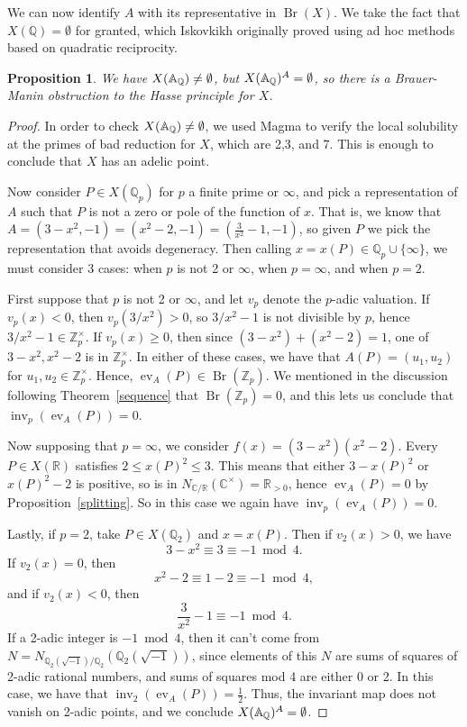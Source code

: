 \documentclass[12pt,twoside]{reedthesis}
\theoremstyle{plain}
\newtheorem{proposition}[theorem]{Proposition}
\theoremstyle{definition}
\theoremstyle{remark}
\newcommand{\ZZ}{\mathbb{Z}}
\newcommand{\Affine}{\mathbb{A}}
\newcommand{\QQ}{\mathbb{Q}}
\newcommand{\RR}{\mathbb{R}}
\newcommand{\CC}{\mathbb{C}}
\newcommand{\Br}{\operatorname{Br}}
\newcommand{\adele}{\reflectbox{$\Affine$}}
\newcommand{\ev}{\operatorname{ev}}
\newcommand{\inv}{\operatorname{inv}}
\begin{document}
\noindent We can now identify $A$ with its representative in $\Br(X)$. We take the fact that $X(\QQ)=\emptyset$ for granted, which Iskovkikh originally proved using ad hoc methods based on quadratic reciprocity.
\begin{proposition}
We have $X(\adele_\QQ)\neq\emptyset$, but $X(\adele_\QQ)^A=\emptyset$, so there is a Brauer-Manin obstruction to the Hasse principle for $X$.
\end{proposition}
\begin{proof}
In order to check $X(\adele_\QQ)\neq\emptyset$, we used Magma to verify the local solubility at the primes of bad reduction for $X$, which are 2,3, and 7. This is enough to conclude that $X$ has an adelic point.

Now consider $P\in X(\QQ_p)$ for $p$ a finite prime or $\infty$, and pick a representation of $A$ such that $P$ is not a zero or pole of the function of $x$. That is, we know that $A=(3-x^2,-1)=(x^2-2,-1)=(\frac{3}{x^2}-1,-1)$, so given $P$ we pick the representation that avoids degeneracy. Then calling $x=x(P)\in\QQ_p\cup\{\infty\}$, we must consider 3 cases: when $p$ is not 2 or $\infty$, when $p=\infty$, and when $p=2$.

First suppose that $p$ is not 2 or $\infty$, and let $v_p$ denote the $p$-adic valuation. If $v_p(x)<0$, then $v_p(3/x^2)>0$, so $3/x^2-1$ is not divisible by $p$, hence $3/x^2-1\in\ZZ_p^\times$. If $v_p(x)\geq0$, then since $(3-x^2)+(x^2-2)=1$, one of $3-x^2,x^2-2$ is in $\ZZ_p^\times$. In either of these cases, we have that $A(P)=(u_1,u_2)$ for $u_1,u_2\in\ZZ_p^\times$. Hence, $\ev_A(P)\in\Br(\ZZ_p)$. We mentioned in the discussion following Theorem~\ref{sequence} that $\Br(\ZZ_p)=0$, and this lets us conclude that $\inv_p(\ev_A(P))=0$.

Now supposing that $p=\infty$, we consider $f(x)=(3-x^2)(x^2-2)$. Every $P\in X(\RR)$ satisfies $2\leq x(P)^2\leq 3$. This means that either $3-x(P)^2$ or $x(P)^2-2$ is positive, so is in $N_{\CC/\RR}(\CC^\times)=\RR_{>0}$, hence $\ev_A(P)=0$ by Proposition~\ref{splitting}. So in this case we again have $\inv_p(\ev_A(P))=0$.

Lastly, if $p=2$, take $P\in X(\QQ_2)$ and $x=x(P)$. Then if $v_2(x)>0$, we have
\[
3-x^2\equiv3\equiv-1\bmod4.
\]
If $v_2(x)=0$, then
\[
x^2-2\equiv1-2\equiv-1\bmod4,
\]
and if $v_2(x)<0$, then
\[
\frac{3}{x^2}-1\equiv-1\bmod4.
\]
If a 2-adic integer is $-1\bmod4$, then it can't come from $ N=N_{\QQ_2(\sqrt{-1})/\QQ_2}(\QQ_2(\sqrt{-1}))$, since elements of this $N$ are sums of squares of 2-adic rational numbers, and sums of squares mod 4 are either 0 or 2. In this case, we have that $\inv_2(\ev_A(P))=\frac{1}{2}$. Thus, the invariant map does not vanish on 2-adic points, and we conclude $X(\adele_\QQ)^A=\emptyset$.
\end{proof}
\end{document}
